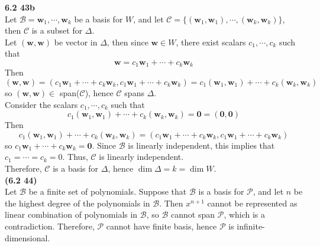 \textbf{6.2 43b} \\
Let $\mathcal{B} = \textbf{w}_1, \cdots, \textbf{w}_k$ be a basis for $W$, and let $\mathcal{C} = \{(\textbf{w}_1, \textbf{w}_1), \cdots, (\textbf{w}_k, \textbf{w}_k)\}$, then $\mathcal{C}$ is a subset for $\Delta$. \\

Let $(\textbf{w}, \textbf{w})$ be vector in $\Delta$, then since $\textbf{w} \in W$, there exist scalars $c_1, \cdots, c_k$ such that \begin{equation*}
	\textbf{w} = c_1\textbf{w}_1 + \cdots + c_k\textbf{w}_k
\end{equation*} Then \begin{equation*}
	(\textbf{w}, \textbf{w}) = (c_1\textbf{w}_1 + \cdots + c_k\textbf{w}_k, c_1\textbf{w}_1 + \cdots + c_k\textbf{w}_k) = c_1(\textbf{w}_1, \textbf{w}_1) + \cdots + c_k(\textbf{w}_k, \textbf{w}_k)
\end{equation*} so $(\textbf{w}, \textbf{w}) \in$ span($\mathcal{C}$), hence $\mathcal{C}$ spans $\Delta$. \\

Consider the scalars $c_1, \cdots, c_k$ such that \begin{equation*}
	c_1(\textbf{w}_1, \textbf{w}_1) + \cdots + c_k(\textbf{w}_k, \textbf{w}_k) = \textbf{0} = (\textbf{0}, \textbf{0})
\end{equation*} Then \begin{equation*}
	c_1(\textbf{w}_1, \textbf{w}_1) + \cdots + c_k(\textbf{w}_k, \textbf{w}_k) = (c_1\textbf{w}_1 + \cdots + c_k\textbf{w}_k, c_1\textbf{w}_1 + \cdots + c_k\textbf{w}_k)
\end{equation*} so $c_1\textbf{w}_1 + \cdots + c_k\textbf{w}_k = \textbf{0}$. Since $\mathcal{B}$ is linearly independent, this implies that $c_1 = \cdots = c_k = 0$. Thus, $\mathcal{C}$ is linearly independent. \\

Therefore, $\mathcal{C}$ is a basis for $\Delta$, hence $\dim \Delta = k = \dim W$. \\

\textbf{(6.2 44)} \\
Let $\mathcal{B}$ be a finite set of polynomials. Suppose that $\mathcal{B}$ is a basis for $\mathscr{P}$, and let $n$ be the highest degree of the polynomials in $\mathcal{B}$. Then $x^{n+1}$ cannot be represented as linear combination of polynomials in $\mathcal{B}$, so $\mathcal{B}$ cannot span $\mathscr{P}$, which is a contradiction. Therefore, $\mathscr{P}$ cannot have finite basis, hence $\mathscr{P}$ is infinite-dimensional. \\

